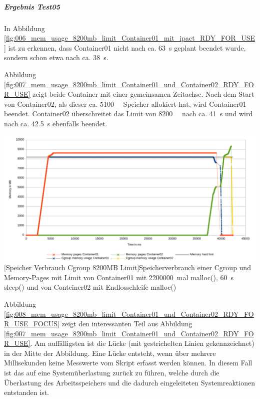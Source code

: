 \subparagraph{Ergebnis Test05}
In Abbildung \ref{fig:006_mem_usage_8200mb_limit_Container01_mit_ipact_RDY_FOR_USE} ist zu erkennen, dass Container01 nicht nach ca. \SI{63}{\second} geplant beendet wurde, sondern schon etwa nach ca. \SI{38}{\second}.

Abbildung \ref{fig:007_mem_usage_8200mb_limit_Container01_und_Container02_RDY_FOR_USE} zeigt beide Container mit einer gemeinsamen Zeitachse. Nach dem Start von Container02, als dieser ca. \SI{5100}{\mega\byte} Speicher allokiert hat, wird Container01 beendet. Container02 überschreitet das Limit von \SI{8200}{\mega\byte} nach ca. \SI{41}{\second} und wird nach ca. \SI{42,5}{\second} ebenfalls beendet.

\vspace{1em}
\begin{minipage}{\linewidth}
	\centering
	\includegraphics[width=1\linewidth]{pics/007_mem_usage_8200mb_limit_Container01_und_Container02_RDY_FOR_USE.png}
	[Speicher Verbrauch Cgroup 8200MB Limit]{Speicherverbrauch einer Cgroup und Memory-Pages mit Limit von Container01 mit \SI{2200000}{mal} malloc(), \SI{60}{\second} sleep() und von Conteiner02 mit Endlosschleife malloc()}
	\label{fig:007_mem_usage_8200mb_limit_Container01_und_Container02_RDY_FOR_USE}
\end{minipage}

Abbildung \ref{fig:008_mem_usage_8200mb_limit_Container01_und_Container02_RDY_FOR_USE_FOCUS} zeigt den interessanten Teil aus Abbildung \ref{fig:007_mem_usage_8200mb_limit_Container01_und_Container02_RDY_FOR_USE}. Am auffälligsten ist die Lücke (mit gestrichelten Linien gekennzeichnet) in der Mitte der Abbildung. Eine Lücke entsteht, wenn über mehrere Millisekunden keine Messwerte vom Skript erfasst werden können. In diesem Fall ist das auf eine Systemüberlastung zurück zu führen, welche durch die Überlastung des Arbeitsspeichers und die dadurch eingeleiteten Systemreaktionen entstanden ist. 

